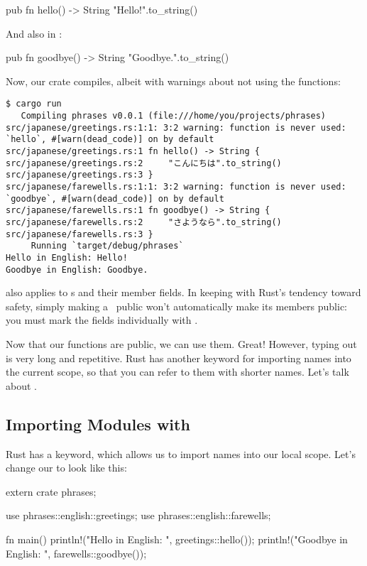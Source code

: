 \begin{rustc}
pub fn hello() -> String {
    "Hello!".to_string()
}
\end{rustc}

And also in :

\begin{rustc}
pub fn goodbye() -> String {
    "Goodbye.".to_string()
}
\end{rustc}

Now, our crate compiles, albeit with warnings about not using the  functions:

\begin{verbatim}
$ cargo run
   Compiling phrases v0.0.1 (file:///home/you/projects/phrases)
src/japanese/greetings.rs:1:1: 3:2 warning: function is never used: `hello`, #[warn(dead_code)] on by default
src/japanese/greetings.rs:1 fn hello() -> String {
src/japanese/greetings.rs:2     "こんにちは".to_string()
src/japanese/greetings.rs:3 }
src/japanese/farewells.rs:1:1: 3:2 warning: function is never used: `goodbye`, #[warn(dead_code)] on by default
src/japanese/farewells.rs:1 fn goodbye() -> String {
src/japanese/farewells.rs:2     "さようなら".to_string()
src/japanese/farewells.rs:3 }
     Running `target/debug/phrases`
Hello in English: Hello!
Goodbye in English: Goodbye.
\end{verbatim}

 also applies to \struct s and their member fields. In keeping with Rust's tendency toward safety, simply making a \struct\ 
public won't automatically make its members public: you must mark the fields individually with .

\blank

Now that our functions are public, we can use them. Great! However, typing out  is very long 
and repetitive. Rust has another keyword for importing names into the current scope, so that you can refer to them with shorter names. 
Let's talk about .

\subsection*{Importing Modules with }

Rust has a \code{use} keyword, which allows us to import names into our local scope. Let's change our  to look like this:

\begin{rustc}
extern crate phrases;

use phrases::english::greetings;
use phrases::english::farewells;

fn main() {
    println!("Hello in English: {}", greetings::hello());
    println!("Goodbye in English: {}", farewells::goodbye());
}
\end{rustc}

